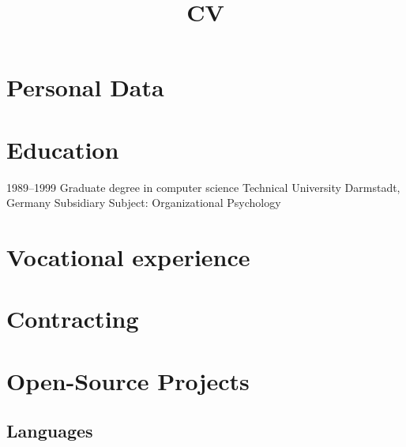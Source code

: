 \documentclass[12pt,a4paper,sans]{moderncv}
\title{CV}
\begin{document}
\makecvtitle

\section{Personal Data}

\section{Education}
\cventry
{1989--1999}
{Graduate degree in computer science}
{}
{Technical University}
{Darmstadt, Germany}
{Subsidiary Subject: Organizational Psychology}

\section{Vocational experience}

















\section{Contracting}






\section{Open-Source Projects}





\begin{samepage}
\section{Languages}
\end{samepage}
\end{document}
